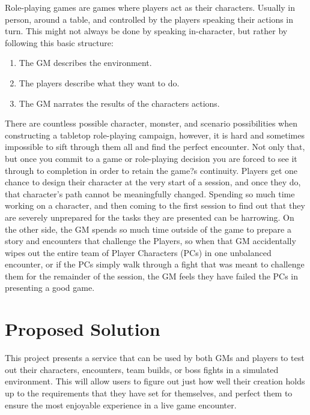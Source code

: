 \documentclass[12pt,a4paper]{report}
\begin{document}
Role-playing games are games where players act as their characters. Usually in person, around a table, and controlled by the players speaking their actions in turn. This might not always be done by speaking in-character, but rather by following this basic structure:

\begin{enumerate}
	\item The GM describes the environment.
	\item The players describe what they want to do.
	\item The GM narrates the results of the characters actions.
\end{enumerate}

There are countless possible character, monster, and scenario possibilities when constructing a tabletop role-playing campaign, however, it is hard and sometimes impossible to sift through them all and find the perfect encounter. Not only that,  but once you commit to a game or role-playing decision you are forced to see it through to completion in order to retain the game?s continuity. Players get one chance to design their character at the very start of a session, and once they do, that character's path cannot be meaningfully changed. Spending so much time working on a character, and then coming to the first session to find out that they are severely unprepared for the tasks they are presented can be harrowing. On the other side, the GM spends so much time outside of the game to prepare a story and encounters that challenge the Players, so when that GM accidentally wipes out the entire team of Player Characters (PCs) in one unbalanced encounter, or if the PCs simply walk through a fight that was meant to challenge them for the remainder of the session, the GM feels they have failed the PCs in presenting a good game.
\newpage
\chapter*{Proposed Solution}

This project presents a service that can be used by both GMs and players to test out their characters, encounters, team builds, or boss fights in a simulated environment. This will allow users to figure out just how well their creation holds up to the requirements that they have set for themselves, and perfect them to ensure the most enjoyable experience in a live game encounter.
\end{document}
